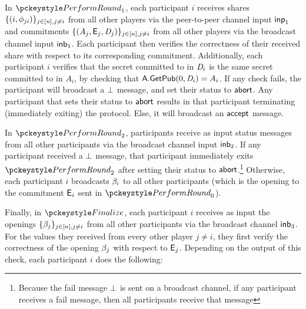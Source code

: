 In $\dkgkeygen_1$,
each participant $i$ receives shares $ \{(i, \phi_{ji}) \}_{j \in [n], j \neq i} $
from all other players via the peer-to-peer channel input $\mathsf{inp}_1$
and commitments $\{ (A_j, \mathsf{E}_j, \textit{D}_j) \}_{j \in [n], j \neq i} $
from all other players via the broadcast channel input $\mathsf{inb}_1$.
Each participant then verifies the correctness of their received share with respect to its corresponding commitment.
Additionally, each participant $i$ verifies that the secret committed to in $\textit{D}_i$ is the same secret committed to in $A_i$,
by checking that $\mathsf{A}.\mathsf{GetPub}(0, \textit{D}_i) = A_i$.
If any check fails, the participant will broadcast a $\bot$ message,
and set their status to $\mathsf{abort}$.
Any participant that sets their status to $\mathsf{abort}$ results in that participant terminating (immediately exiting) the protocol.
Else, it will broadcast an $\mathsf{accept}$ message.

In $\dkgkeygen_2$,
participants receive as input status messages from all other participants via the broadcast channel input $\mathsf{inb}_2$.
If any participant received a $\bot$ message,
that participant immediately exits $\dkgkeygen_2$
after setting their status to $\mathsf{abort}$.\footnote{Because the fail message $\bot$ is sent on a broadcast channel,
if any participant receives a fail message, then all participants receive that message}
Otherwise, each participant $i$ broadcasts $\beta_i$ to all other participants (which is the opening
to the commitment $\mathsf{E}_i$ sent in $\dkgkeygen_0$).

Finally, in $\finalize$, each participant $i$ receives as input the openings $\{ \beta_j \}_{j \in [n], j \neq i} $
from all other participants via the broadcast channel $\mathsf{inb}_3$.
For the values they received from every other player $j \neq i$, they first verify the correctness of the opening $\beta_j$ with respect to $\mathsf{E}_j$.
Depending on the output of this check, each participant $i$ does the following:

